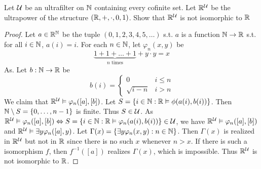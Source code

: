 \documentclass[11pt]{article}
\begin{document}
\begin{exercise}[]
Let \(\mathcal{U}\) be an ultrafilter on \(\mathbb{N}\) containing every cofinite set. Let \(\mathbb{R}^{\mathcal{U}}\) be the ultrapower
of the structure \((\mathbb{R},+,\cdot,0,1)\). Show that \(\mathbb{R}^{\mathcal{U}}\) is not isomorphic to \(\mathbb{R}\)
\end{exercise}

\begin{proof}
Let \(a\in\mathbb{R}^{\mathbb{N}}\) be the tuple \((0,1,2,3,4,5,\dots)\) s.t.  \(a\) is a function \(\mathbb{N}\to \mathbb{R}\) s.t. for
all \(i\in\mathbb{N}\), \(a(i)=i\). For each \(n\in\mathbb{N}\), let \(\varphi_n(x,y)\) be
\begin{equation*}
\underbrace{1+1+\dots+1}_{n\text{ times}}+y\cdot y=x
\end{equation*}
As. Let \(b:\mathbb{N}\to\mathbb{R}\) be
\begin{equation*}
b(i)=
\begin{cases}
0&i\le n\\
\sqrt{i-n}&i>n
\end{cases}
\end{equation*}
We claim that \(\mathbb{R}^{\mathcal{U}}\vDash\varphi_n([a],[b])\). Let \(S=\{i\in\mathbb{N}:\mathbb{R}\vDash\phi(a(i),b(i))\}\). Then \(\mathbb{N}\setminus S=\{0,\dots,n-1\}\) is
finite. Thus \(S\in\mathcal{U}\). As \(\mathbb{R}^{\mathcal{U}}\vDash\varphi_n([a],[b])\Leftrightarrow S=\{i\in\mathbb{N}:\mathbb{R}\vDash\varphi_n(a(i),b(i))\}\in\mathcal{U}\), we
have \(\mathbb{R}^{\mathcal{U}}\vDash\varphi_n([a],[b])\) and \(\mathbb{R}^{\mathcal{U}}\vDash\exists y\varphi_n([a],y)\). Let \(\Gamma(x)=\{\exists y\varphi_n(x,y):n\in\mathbb{N}\}\). Then \(\Gamma(x)\)
is realized in \(\mathbb{R}^{\mathcal{U}}\) but not in \(\mathbb{R}\) since there is no such \(x\) whenever \(n>x\). If there is such a
isomorphism \(f\), then \(f^{-1}([a])\) realizes \(\Gamma(x)\), which is impossible. Thus \(\mathbb{R}^{\mathcal{U}}\) is
not isomorphic to \(\mathbb{R}\).
\end{proof}
\end{document}
